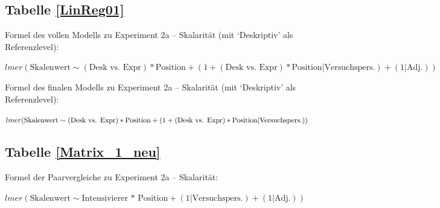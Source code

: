 \subsection{{Tabelle \ref{LinReg01}}}

\ea
Formel des vollen Modells zu Experiment 2a -- Skalarität (mit `Deskriptiv' als Referenzlevel):
\smallskip


$ lmer(\text{Skalenwert} \sim (\text{Desk vs. Expr}) * \text{Position} + (1 + (\text{Desk vs. Expr}) * \text{Position|Versuchspers.}) + (1|\text{Adj.})) $
\z

\ea
Formel des finalen Modells zu Experiment 2a -- Skalarität (mit `Deskriptiv' als Referenzlevel):
\smallskip


$ lmer(\text{Skalenwert}\sim(\text{Desk vs. Expr}) * \text{Position} + (1 + (\text{Desk vs. Expr}) *\linebreak \text{Position}|\text{Versuchspers.}))$
\z


\subsection{{Tabelle \ref{Matrix_1_neu}}}

\ea
Formel der Paarvergleiche zu Experiment 2a -- Skalarität:
\smallskip


$ lmer(\text{Skalenwert} \sim \text{Intensivierer * Position} + (1|\text{Versuchspers.}) + (1|\text{Adj.})) $
\z


